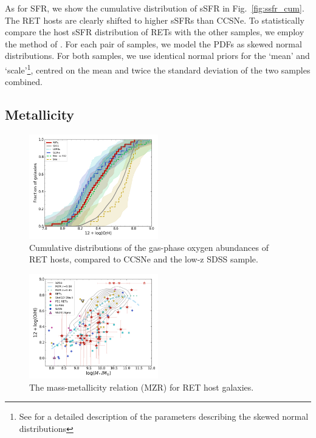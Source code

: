\documentclass[fleqn,usenatbib,]{mnras}
\begin{document}
As for SFR, we show the cumulative distribution of sSFR in Fig.~\ref{fig:ssfr_cum}. The RET hosts are clearly shifted to higher sSFRs than CCSNe. To statistically compare the host sSFR distribution of RETs with the other samples, we employ the method of \citet{Wiseman2020}. For each pair of samples, we model the PDFs as skewed normal distributions. For both samples, we use identical normal priors for the `mean' and `scale'\footnote{See \citet{Wiseman2020} for a detailed description of the parameters describing the skewed normal distributions}, centred on the mean and twice the standard deviation of the two samples combined. 

\subsection{Metallicity \label{subsec:res_metallicity}}

\begin{figure}
\includegraphics[width=0.5\textwidth]{figs/RET_OH_cum.png}
\caption{Cumulative distributions of the gas-phase oxygen abundances of RET hosts, compared to CCSNe and the low-z SDSS sample.
\label{fig:oh_cum}}
\end{figure}

\begin{figure}
\includegraphics[width=0.5\textwidth]{figs/RET_MZR.png}
\caption{The mass-metallicity relation (MZR) for RET host galaxies.
\label{fig:mzr}}
\end{figure}
\end{document}
